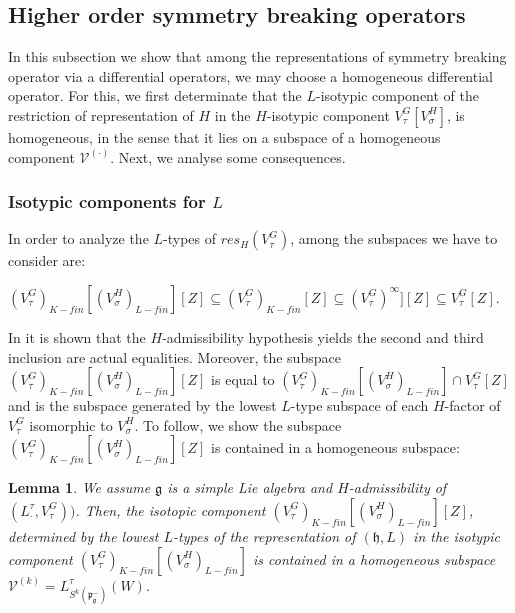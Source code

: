 \documentclass[12pt]{amsart}
\newtheorem{lem}[thm]{Lemma}
\theoremstyle{definition}
\theoremstyle{remark}
\newcommand{\g}{\mathfrak{g}}
\newcommand{\h}{\mathfrak{h}}
\newcommand{\p}{\mathfrak p}
\numberwithin{equation}{section}
\begin{document}
\subsection{Higher order symmetry breaking operators} In this subsection we show that among the representations of symmetry breaking operator via a differential operators, we may choose a homogeneous differential operator.  For this, we first determinate  that the $L$-isotypic component  of the restriction of representation of $H$ in the $H$-isotypic component  $V_\tau^G[V_\sigma^H]$, is  homogeneous, in the sense that it lies on a subspace of a homogeneous component $\mathcal V^{(\cdot)}$. Next, we analyse some consequences.
\subsubsection{Isotypic components for $L$}\label{sub:disjoint} In order to analyze the $L$-types of $res_H(V_\tau^G)$, among the subspaces   we have to consider are:

$(V_\tau^G)_{K-fin}[(V_\sigma^H)_{L-fin}][Z] \subseteq (V_\tau^G)_{K-fin}[Z] \subseteq (V_\tau^G)^{\infty}][Z]\subseteq V_\tau^G[Z]$.

\noindent
In \cite{Kobdd3} it is shown that the $H$-admissibility hypothesis yields the second and third inclusion are actual  equalities. Moreover,   the subspace $(V_\tau^G)_{K-fin}[(V_\sigma^H)_{L-fin}][Z]$ is equal to $(V_\tau^G)_{K-fin}[(V_\sigma^H)_{L-fin}] \cap V_\tau^G[Z]$ and is the subspace   generated by the lowest $L$-type subspace of each $H$-factor of $V_\tau^G$ isomorphic to $V_\sigma^H$.
   To follow, we show the subspace $(V_\tau^G)_{K-fin}[(V_\sigma^H)_{L-fin}][Z]$ is contained in  a homogeneous subspace: \begin{lem} We assume $\g$ is a simple Lie algebra and   $H$-admissibility of $(L_\cdot^\tau , V_\tau^G))$. Then, the isotopic component $(V_\tau^G)_{K-fin}[(V_\sigma^H)_{L-fin}][Z]$, determined by the lowest $L$-types  of the representation of $(\h,L)$  in the  isotypic component $(V_\tau^G)_{K-fin}[(V_\sigma^H)_{L-fin}]$   is contained in a homogeneous subspace $\mathcal V^{(k)} =L_{ S^k(\p_\g^- )}^\tau ( W) .$ \end{lem}
\end{document}
